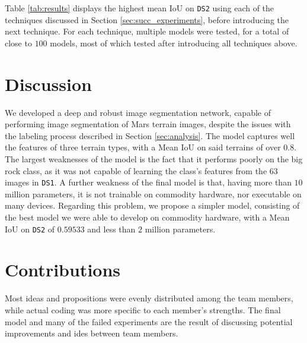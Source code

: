\documentclass[11pt]{article}
\begin{document}
\begin{multicols}{2}
      Table \ref{tab:results} displays the highest mean IoU on \texttt{DS2} using each of the techniques discussed in Section \ref{sec:succ_experiments}, before introducing the next technique. For each technique, multiple models were tested, for a total of close to $100$ models, most of which tested after introducing all techniques above.

      \section{Discussion}

      We developed a deep and robust image segmentation network, capable of performing image segmentation of Mars terrain images, despite the issues with the labeling process described in Section \ref{sec:analysis}. The model captures well the features of three terrain types, with a Mean IoU on said terrains of over $0.8$. The largest weaknesses of the model is the fact that it performs poorly on the big rock class, as it was not capable of learning the class's features from the $63$ images in \texttt{DS1}. A further weakness of the final model is that, having more than $10$ million parameters, it is not trainable on commodity hardware, nor executable on many devices. Regarding this problem, we propose a simpler model, consisting of the best model we were able to develop on commodity hardware, with a Mean IoU on \texttt{DS2} of $0.59533$ and less than $2$ million parameters.

      \section{Contributions}

      Most ideas and propositions were evenly distributed among the team members, while actual coding was more specific to each member's strengths. The final model and many of the failed experiments are the result of discussing potential improvements and ides between team members.


\end{multicols}
\end{document}
